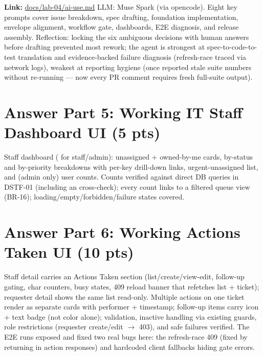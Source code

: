 \documentclass[11pt,a4paper]{article}
\begin{document}
\textbf{Link:} \href{https://github.com/thhanabun/Software\_Eng\_Lab/blob/main/docs/lab-04/ai-use.md}{docs/lab-04/ai-use.md}
LLM: Muse Spark (via opencode). Eight key prompts cover issue breakdown, spec drafting,
foundation implementation, envelope alignment, workflow gate, dashboards, E2E diagnosis,
and release assembly. Reflection: locking the six ambiguous decisions with human answers
before drafting prevented most rework; the agent is strongest at spec-to-code-to-test
translation and evidence-backed failure diagnosis (refresh-race traced via network logs),
weakest at reporting hygiene (once reported stale suite numbers without re-running —
now every PR comment requires fresh full-suite output).

\section*{Answer Part 5: Working IT Staff Dashboard UI (5 pts)}

Staff dashboard ( for staff/admin): unassigned + owned-by-me cards,
by-status and by-priority breakdowns with per-key drill-down links, urgent-unassigned
list, and (admin only) user counts. Counts verified against direct DB queries in
DSTF-01 (including an  cross-check); every count links to a filtered
queue view (BR-16); loading/empty/forbidden/failure states covered.


\section*{Answer Part 6: Working Actions Taken UI (10 pts)}

Staff detail carries an Actions Taken section (list/create/view-edit, follow-up gating,
char counters, busy states, 409 reload banner that refetches list + ticket); requester
detail shows the same list read-only. Multiple actions on one ticket render as separate
cards with performer + timestamp; follow-up items carry icon + text badge (not color
alone); validation, inactive handling via existing guards, role restrictions (requester
create/edit $\to$ 403), and safe failures verified. The E2E runs exposed and fixed two
real bugs here: the refresh-race 409 (fixed by returning  in action
responses) and hardcoded client fallbacks hiding gate errors.
\end{document}
